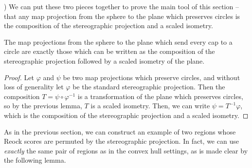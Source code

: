 )
We can put these two pieces together to prove the main tool of this
section -- that any map projection from the sphere to the plane which
preserves circles is the composition of the stereographic projection
and a scaled isometry.

\begin{lemma}
  The map projections from the sphere to the plane which send every
  cap to a circle are exactly those which can be written as the
  composition of the stereographic projection followed by a scaled
  isometry of the plane.
\end{lemma}
\begin{proof}
  Let $\varphi$ and $\psi$ be two map projections which preserve
  circles, and without loss of generality let $\varphi$ be the
  standard stereographic projection.  Then the composition
  $T=\psi\circ\varphi^{-1}$ is a transformation of the plane which
  preserves circles, so by the previous lemma, $T$ is a scaled
  isometry.  Then, we can write $\psi= T^{-1}\varphi$, which is the
  composition of the stereographic projection and a scaled isometry.
\end{proof}



As in the previous section, we can construct an example of two regions
whose Reock scores are permuted by the stereographic projection.  In
fact, we can use \textit{exactly} the same pair of regions as in the
convex hull settings, as is made clear by the following lemma.

